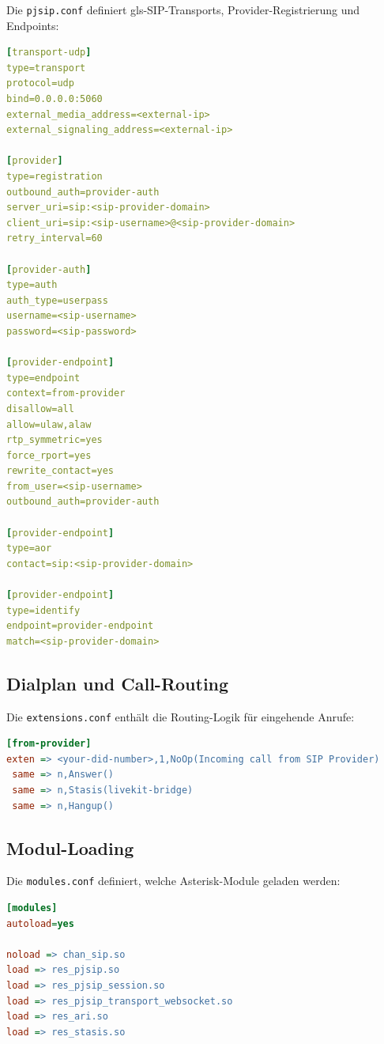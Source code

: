 Die \texttt{pjsip.conf} definiert \gls{gls-SIP}-Transports, Provider-Registrierung und Endpoints:

\begin{lstlisting}[language=yaml,caption={pjsip.conf - SIP-Konfiguration}]
[transport-udp]
type=transport
protocol=udp
bind=0.0.0.0:5060
external_media_address=<external-ip>
external_signaling_address=<external-ip>

[provider]
type=registration
outbound_auth=provider-auth
server_uri=sip:<sip-provider-domain>
client_uri=sip:<sip-username>@<sip-provider-domain>
retry_interval=60

[provider-auth]
type=auth
auth_type=userpass
username=<sip-username>
password=<sip-password>

[provider-endpoint]
type=endpoint
context=from-provider
disallow=all
allow=ulaw,alaw
rtp_symmetric=yes
force_rport=yes
rewrite_contact=yes
from_user=<sip-username>
outbound_auth=provider-auth

[provider-endpoint]
type=aor
contact=sip:<sip-provider-domain>

[provider-endpoint]
type=identify
endpoint=provider-endpoint
match=<sip-provider-domain>
\end{lstlisting}

\subsection{Dialplan und Call-Routing}

Die \texttt{extensions.conf} enthält die Routing-Logik für eingehende Anrufe:

\begin{lstlisting}[language=ini,caption={extensions.conf - Dialplan}]
[from-provider]
exten => <your-did-number>,1,NoOp(Incoming call from SIP Provider)
 same => n,Answer()
 same => n,Stasis(livekit-bridge)
 same => n,Hangup()
\end{lstlisting}

\subsection{Modul-Loading}

Die \texttt{modules.conf} definiert, welche Asterisk-Module geladen werden:

\begin{lstlisting}[language=ini,caption={modules.conf - Modulkonfiguration}]
[modules]
autoload=yes

noload => chan_sip.so
load => res_pjsip.so
load => res_pjsip_session.so
load => res_pjsip_transport_websocket.so
load => res_ari.so
load => res_stasis.so
\end{lstlisting}

